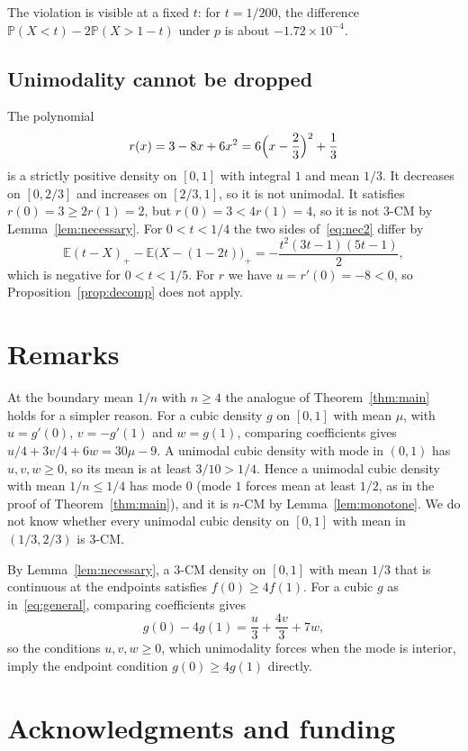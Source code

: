 \documentclass[11pt]{amsart}
\theoremstyle{remark}
\numberwithin{equation}{section}
\newcommand{\E}{\mathbb{E}}
\newcommand{\PP}{\mathbb{P}}
\begin{document}
The violation is visible at a fixed $t$: for $t=1/200$, the difference
$\PP(X<t)-2\PP(X>1-t)$ under $p$ is about $-1.72\times10^{-4}$.

\subsection{Unimodality cannot be dropped}

The polynomial
\[
r(x)=3-8x+6x^2=6\Bigl(x-\frac23\Bigr)^2+\frac13
\]
is a strictly positive density on $[0,1]$ with integral $1$ and mean
$1/3$. It decreases on $[0,2/3]$ and increases on $[2/3,1]$, so it is not
unimodal. It satisfies $r(0)=3\ge2r(1)=2$, but $r(0)=3<4r(1)=4$, so it is
not $3$-CM by Lemma~\ref{lem:necessary}. For $0<t<1/4$ the two sides
of~\eqref{eq:nec2} differ by
\[
\E(t-X)_+-\E\bigl(X-(1-2t)\bigr)_+=-\frac{t^2(3t-1)(5t-1)}2,
\]
which is negative for $0<t<1/5$. For $r$ we have $u=r'(0)=-8<0$, so
Proposition~\ref{prop:decomp} does not apply.

\section{Remarks}\label{sec:remarks}

At the boundary mean $1/n$ with $n\ge4$ the analogue of
Theorem~\ref{thm:main} holds for a simpler reason. For a cubic density $g$
on $[0,1]$ with mean $\mu$, with $u=g'(0)$, $v=-g'(1)$ and $w=g(1)$,
comparing coefficients gives $u/4+3v/4+6w=30\mu-9$. A unimodal cubic
density with mode in $(0,1)$ has $u,v,w\ge0$, so its mean is at least
$3/10>1/4$. Hence a unimodal cubic density with mean $1/n\le1/4$ has mode
$0$ (mode $1$ forces mean at least $1/2$, as in the proof of
Theorem~\ref{thm:main}), and it is $n$-CM by Lemma~\ref{lem:monotone}. We do
not know whether every unimodal cubic density on $[0,1]$ with mean in
$(1/3,2/3)$ is $3$-CM.

By Lemma~\ref{lem:necessary}, a $3$-CM density on $[0,1]$ with mean $1/3$
that is continuous at the endpoints satisfies $f(0)\ge4f(1)$. For a cubic
$g$ as in~\eqref{eq:general}, comparing coefficients
gives
\[
g(0)-4g(1)=\frac u3+\frac{4v}3+7w,
\]
so the conditions $u,v,w\ge0$, which unimodality forces when the mode is
interior, imply the endpoint condition $g(0)\ge4g(1)$ directly.

\section*{Acknowledgments and funding}
\end{document}
